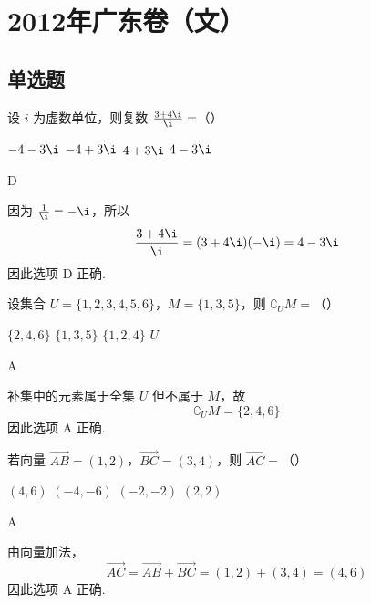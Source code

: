 \chapter{2012年广东卷（文）}

\section{单选题}

\begin{problem}
设 \(i\) 为虚数单位，则复数 \( \frac{3+4\i}{\i}=\)（\quad）

\choices
    {\(-4 - 3\i\)}
    {\(-4 + 3\i\)}
    {\(4 + 3\i\)}
    {\(4 - 3\i\)}
\end{problem}

\begin{answer}
D
\end{answer}

\begin{solution}
因为 \(\frac{1}{\i}=-\i\)，所以
\[
\frac{3+4\i}{\i}=(3+4\i)(-\i)=4-3\i
\]
因此选项 D 正确.
\end{solution}

\begin{problem}
设集合 \(U = \{1, 2, 3, 4, 5, 6\}\)，\(M = \{1, 3, 5\}\)，则 \(\complement_U M =\)（\quad）

\choices
    {\(\{2, 4, 6\}\)}
    {\(\{1,3,5\}\)}
    {\(\{1,2,4\}\)}
    {\(U\)}
\end{problem}

\begin{answer}
A
\end{answer}

\begin{solution}
补集中的元素属于全集 \(U\) 但不属于 \(M\)，故
\[
\complement_U M=\{2,4,6\}
\]
因此选项 A 正确.
\end{solution}

\begin{problem}
若向量 \(\overrightarrow{AB} = (1, 2)\)，\(\overrightarrow{BC} = (3, 4)\)，则 \(\overrightarrow{AC} =\)（\quad）

\choices
    {\((4,6)\)}
    {\((-4, -6)\)}
    {\((-2, - 2)\)}
    {\((2, 2)\)}
\end{problem}

\begin{answer}
A
\end{answer}

\begin{solution}
由向量加法，
\[
\overrightarrow{AC}=\overrightarrow{AB}+\overrightarrow{BC}=(1,2)+(3,4)=(4,6)
\]
因此选项 A 正确.
\end{solution}

